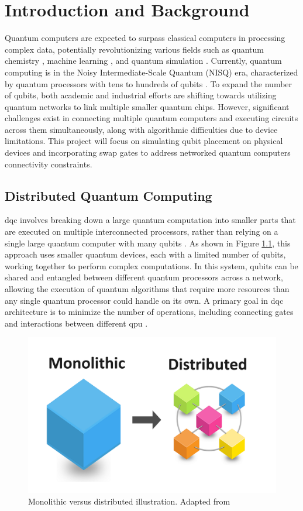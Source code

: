 \chapter{Introduction and Background} \label{Chap2}

Quantum computers are expected to surpass classical computers in processing complex data, potentially revolutionizing various fields such as quantum chemistry \cite{Cao2019}, machine learning \cite{paler_machine_2023}, and quantum simulation \cite{peruzzo_variational_2014}. Currently, quantum computing is in the Noisy Intermediate-Scale Quantum (NISQ) era, characterized by quantum processors with tens to hundreds of qubits \cite{preskill_quantum_2018}. To expand the number of qubits, both academic and industrial efforts are shifting towards utilizing quantum networks to link multiple smaller quantum chips. However, significant challenges exist in connecting multiple quantum computers and executing circuits across them simultaneously, along with algorithmic difficulties due to device limitations. This project will focus on simulating qubit placement on physical devices and incorporating swap gates to address networked quantum computers connectivity constraints.

\section{Distributed Quantum Computing} %
\acrfull{dqc} involves breaking down a large quantum computation into smaller parts that are executed on multiple interconnected processors, rather than relying on a single large quantum computer with many qubits \cite{cuomo_towards_2020}. As shown in Figure \ref{fig:mono-vs-distributed}, this approach uses smaller quantum devices, each with a limited number of qubits, working together to perform complex computations. In this system, qubits can be shared and entangled between different quantum processors across a network, allowing the execution of quantum algorithms that require more resources than any single quantum processor could handle on its own. A primary goal in \acrshort{dqc} architecture is to minimize the number of operations, including connecting gates and interactions between different \acrfull{qpu} \cite{caleffi_distributed_2024}.
\begin{figure}[htb]
    \centering
    \includegraphics[width=0.4\linewidth]{image/mono vs distributed.png}
    \caption{Monolithic versus distributed illustration. Adapted from \cite{boroglu_microservices_2024}}
    \label{fig:mono-vs-distributed}
\end{figure}

